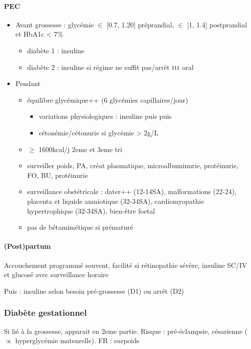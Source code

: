 \documentclass[11pt]{article}
\begin{document}
\paragraph{PEC}
\label{sec:org5669fef}
\begin{itemize}
\item Avant grossesse : glycémie \(\in\) [0.7, 1.20] préprandial, \(\in\) [1, 1.4]
postprandial et HbA1c < 7\%
\begin{itemize}
\item diabète 1 : \inc insuline
\item diabète 2 : insuline si régime ne suffit pas/arrêt ttt oral
\end{itemize}
\item Pendant    
\begin{itemize}
\item équilibre glycémique++ (6 glycémies capillaires/jour)
\begin{itemize}
\item \danger variations physiologiques : insuline \dec puis \inc puis \dec\dec
\item cétonémie/cétonurie si glycémie > 2g/L
\end{itemize}
\item \(\ge\) 1600kcal/j 2eme et 3eme tri
\item surveiller poids, PA, créat plasmatique, microalbuminurie, protéinurie, FO,
BU, protéinurie
\item surveillance obstétricale : dater++ (12-14SA), malformations (22-24), placenta et liquide
amniotique (32-34SA), cardiomyopathie hypertrophique (32-34SA), bien-être
foetal
\item pas de bêtamimétique si prématuré
\end{itemize}
\end{itemize}
\paragraph{(Post)partum}
\label{sec:orge08e7b8}
Accouchement programmé souvent, facilité si rétinopathie sévère, insuline
  SC/IV et glucosé avec surveillance horaire

Puis : insuline selon besoin pré-grossesse (D1) ou arrêt (D2)

\subsubsection{Diabète gestationnel}
\label{sec:org4030fa7}
Si lié à la grossesse, apparait en 2eme partie. Risque : pré-éclampsie,
césarienne (\(\propto\) hyperglycémie matenrelle). FR : surpoids 
\end{document}
